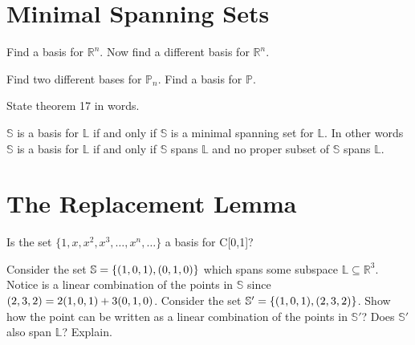 \section{Minimal Spanning Sets}    \label{Minimal Spanning Sets}

\begin{myexa}[\bd{a}]
	Find a basis for $\mathbb{R}^n$. Now find a different basis for $\mathbb{R}^n$.
\end{myexa}

\begin{myexb}[\bd{b}]
	Find two different bases for $\mathbb{P}_n$.  Find a basis for $\mathbb{P}$.
\end{myexb}

\begin{myexc}[\bd{c}]
	State theorem 17 in words.
\end{myexc}

\begin{theorem}
	$\mathbb{S}$ is a basis for $\mathbb{L}$ if and only if $\mathbb{S}$ is a minimal spanning set for $\mathbb{L}$. In other words $\mathbb{S}$ is a basis for $\mathbb{L}$ if and only if $\mathbb{S}$ spans $\mathbb{L}$ and no proper subset of $\mathbb{S}$ spans $\mathbb{L}$.
\end{theorem}
\vspace{-.3in}\hspace{5in}\begin{annotation}
\end{annotation}

\section{The Replacement Lemma}    \label{The Replacement Lemma}

\begin{myexa}[\bd{a}]
      Is the set $\{1, x, x^2, x^3, \ldots,x^n, \ldots\}$ a basis for C[0,1]?	
 \end{myexa}

\begin{myexb}[\bd{b}]
	Consider the set $\mathbb{S}=\{({1},{0},{1}), ({0},{1},{0}) \}$ which spans some subspace $\mathbb{L} \subseteq \mathbb{R}^3$. Notice  is a linear combination of the points in $\mathbb{S}$ since $({2},{3},{2}) =2({1},{0},{1})+ 3({0},{1},{0})$. Consider the set $\mathbb{S}' = \{ ({1},{0},{1}), ({2},{3},{2}) \}$. Show how the point  can be written as a linear combination of the points in $\mathbb{S}'$? Does $\mathbb{S}'$ also span $\mathbb{L}$? Explain.
\end{myexb}

